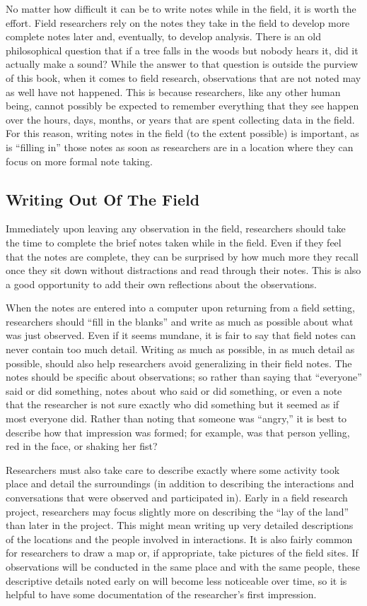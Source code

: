 No matter how difficult it can be to write notes while in the field, it is worth the effort. Field researchers rely on the notes they take in the field to develop more complete notes later and, eventually, to develop analysis. There is an old philosophical question that if a tree falls in the woods but nobody hears it, did it actually make a sound? While the answer to that question is outside the purview of this book, when it comes to field research, observations that are not noted may as well have not happened. This is because researchers, like any other human being, cannot possibly be expected to remember everything that they see happen over the hours, days, months, or years that are spent collecting data in the field. For this reason, writing notes in the field (to the extent possible) is important, as is ``filling in'' those notes as soon as researchers are in a location where they can focus on more formal note taking.

\subsection{Writing Out Of The Field}

Immediately upon leaving any observation in the field, researchers should take the time to complete the brief notes taken while in the field. Even if they feel that the notes are complete, they can be surprised by how much more they recall once they sit down without distractions and read through their notes. This is also a good opportunity to add their own reflections about the observations.

When the notes are entered into a computer upon returning from a field setting, researchers should ``fill in the blanks'' and write as much as possible about what was just observed. Even if it seems mundane, it is fair to say that field notes can never contain too much detail. Writing as much as possible, in as much detail as possible, should also help researchers avoid generalizing in their field notes. The notes should be specific about observations; so rather than saying that ``everyone'' said or did something, notes about who said or did something, or even a note that the researcher is not sure exactly who did something but it seemed as if most everyone did. Rather than noting that someone was ``angry,'' it is best to describe how that impression was formed; for example, was that person yelling, red in the face, or shaking her fist?

Researchers must also take care to describe exactly where some activity took place and detail the surroundings (in addition to describing the interactions and conversations that were observed and participated in). Early in a field research project, researchers may focus slightly more on describing the ``lay of the land'' than later in the project. This might mean writing up very detailed descriptions of the locations and the people involved in interactions. It is also fairly common for researchers to draw a map or, if appropriate, take pictures of the field sites. If observations will be conducted in the same place and with the same people, these descriptive details noted early on will become less noticeable over time, so it is helpful to have some documentation of the researcher's first impression. 

